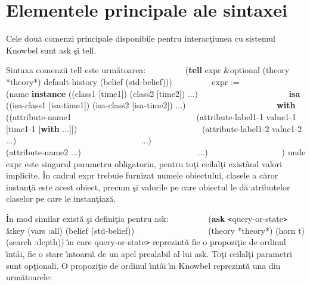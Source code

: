\documentclass{article}
\begin{document}
\newpage
\section{Elementele principale ale sintaxei}
Cele dou\u{a} comenzi principale disponibile pentru interac\c{t}iunea cu sistemul
Knowbel sunt {\sc ask} \c{s}i {\sc tell}.

Sintaxa comenzii {\sc tell} este urm\u{a}toarea:
{\scriptsize
\newline\newline
\verb|        |
({\bf tell} expr &optional (theory *theory*) default-history (belief (std-belief)))
\newline\newline
\verb|        |
expr :=
\newline
\verb|                |
(name {\bf instance} ((class1 [time1]) (class2 [time2]) ...)
\newline
\verb|                    |
{\bf isa} ((isa-class1 [isa-time1]) (isa-class2 [isa-time2]) ...)
\newline
\verb|                    |
{\bf with} ((attribute-name1
\newline
\verb|                            |
(attribute-label1-1 value1-1 [time1-1 [{\bf with} ...]])
\newline
\verb|                            |
(attribute-label1-2 value1-2 ...)
\newline
\verb|                            |
...)
\newline
\verb|                          |
(attribute-name2 ...)
\newline
\verb|                          |
...)
\newline
\verb|                |
)
}
\newline\newline
unde {\sf expr} este singurul parametru obligatoriu, pentru to\c{t}i ceilal\c{t}i
exist\^{a}nd valori implicite. \^{I}n cadrul {\sf expr} trebuie furnizat numele
obiectului, clasele a c\u{a}ror instan\c{t}\u{a} este acest obiect, precum \c{s}i
valorile pe care obiectul le d\u{a} atributelor claselor pe care le instan\c{t}iaz\u{a}.

\^{I}n mod similar exist\u{a} \c{s}i defini\c{t}ia pentru {\sc ask}:
{\scriptsize
\newline\newline
\verb|        |
({\bf ask} {\tt<}query-or-state{\tt>} \&key (vars :all) (belief (std-belief))
\newline
\verb|                |
(theory *theory*) (horn t) (search :depth))
}
\newline\newline
\^{\i}n care {\sf {\tt<}query-or-state{\tt>}} reprezint\u{a} fie o propozi\c{t}ie
de ordinul \^{\i}nt\^{a}i, fie o stare \^{\i}ntoars\u{a} de un apel prealabil
al lui {\sc ask}. To\c{t}i ceilal\c{t}i parametri sunt op\c{t}ionali. O propozi\c{t}ie
de ordinul \^{\i}nt\^{a}i \^{\i}n Knowbel reprezint\u{a} una din urm\u{a}toarele:
\end{document}
